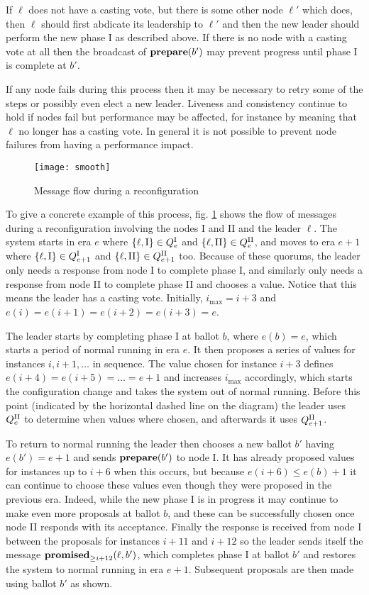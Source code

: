 \documentclass[journal]{IEEEtran}
\begin{document}
If $\ell$ does not have a casting vote, but there is some other node $\ell'$
which does, then $\ell$ should first abdicate its leadership to $\ell'$ and
then the new leader should perform the new phase I as described above. If there
is no node with a casting vote at all then the broadcast of $\mathbf{prepare}(b')$ may
prevent progress until phase I is complete at $b'$.

If any node fails during this process then it may be necessary to retry some of
the steps or possibly even elect a new leader. Liveness and consistency
continue to hold if nodes fail but performance may be affected, for instance by
meaning that $\ell$ no longer has a casting vote. In general it is not possible
to prevent node failures from having a performance impact.

\begin{figure}[!t]
\centering
\texttt{[image: smooth]}
\caption{Message flow during a reconfiguration \label{seq-diag-smooth}}
\end{figure}

To give a concrete example of this process, fig. \ref{seq-diag-smooth} shows
the flow of messages during a reconfiguration involving the nodes I and II and
the leader $\ell$. The system starts in era $e$ where $\{\ell, \textrm{I}\} \in
{Q}^\textrm{I}_{e}$ and $\{\ell, \textrm{II}\} \in {Q}^\textrm{II}_{e}$, and moves to era $e+1$ where
$\{\ell, \textrm{I}\} \in {Q}^\textrm{I}_{e+1}$ and $\{\ell, \textrm{II}\} \in {Q}^\textrm{II}_{e+1}$
too. Because of these quorums, the leader only needs a response from node I to
complete phase I, and similarly only needs a response from node II to complete
phase II and chooses a value.  Notice that this means the leader has a casting
vote.  Initially, $i_\mathrm{max} = i+3$ and $e(i) = e(i+1) = e(i+2) = e(i+3) =
e$.

The leader starts by completing phase I at ballot $b$, where $e(b) = e$, which
starts a period of normal running in era $e$. It then proposes a series of
values for instances $i, i+1, \ldots$ in sequence. The value chosen for
instance $i+3$ defines $e(i+4) = e(i+5) = \ldots = e+1$ and increases
$i_\mathrm{max}$ accordingly, which starts the configuration change and takes
the system out of normal running. Before this point (indicated by the
horizontal dashed line on the diagram) the leader uses ${Q}^\textrm{II}_{e}$ to determine
when values where chosen, and afterwards it uses ${Q}^\textrm{II}_{e+1}$.

To return to normal running the leader then chooses a new ballot $b'$ having
$e(b') = e+1$ and sends $\mathbf{prepare}(b')$ to node I. It has already proposed values
for instances up to $i+6$ when this occurs, but because $e(i+6) \le e(b) + 1$
it can continue to choose these values even though they were proposed in the
previous era. Indeed, while the new phase I is in progress it may continue to
make even more proposals at ballot $b$, and these can be successfully chosen
once node II responds with its acceptance. Finally the response is received
from node I between the proposals for instances $i+11$ and $i+12$ so the leader
sends itself the message $\mathbf{promised}_{\ge i+12}(\ell,b')$, which completes phase I at
ballot $b'$ and restores the system to normal running in era $e+1$. Subsequent
proposals are then made using ballot $b'$ as shown.
\end{document}
